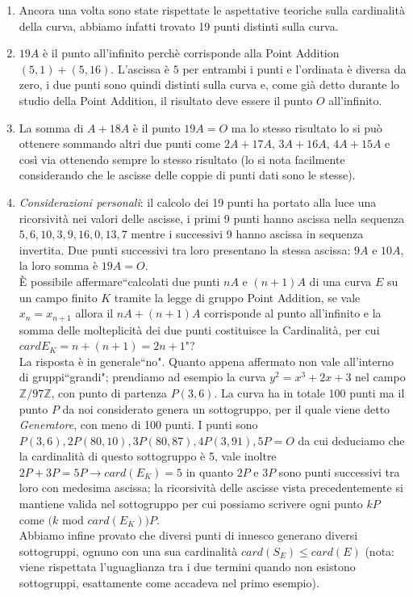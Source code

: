 \documentclass[a4paper,12pt]{tesiinfo}
\begin{document}
\begin{enumerate}
  
  \item Ancora una volta sono state rispettate le aspettative teoriche sulla cardinalit\`a della curva, abbiamo infatti trovato 19 punti distinti sulla curva.
  
  \item $19A$ \`e il punto all'infinito perch\`e corrisponde alla Point Addition $(5, 1) + (5, 16)$. L'ascissa \`e $5$ per entrambi i punti e l'ordinata \`e diversa da zero, i due punti sono quindi distinti sulla curva e, come gi\`a detto durante lo studio della Point Addition, il risultato deve essere il punto $O$ all'infinito.
  
  \item La somma di $A + 18A$ \`e il punto $19A = O$ ma lo stesso risultato lo si pu\`o ottenere sommando altri due punti come $2A + 17A$, $3A + 16A$, $4A + 15A$ e cos\`i via ottenendo sempre lo stesso risultato (lo si nota facilmente considerando che le ascisse delle coppie di punti dati sono le stesse).
  
  \item \textit{Considerazioni personali}: il calcolo dei 19 punti ha portato alla luce una ricorsivit\`a nei valori delle ascisse, i primi 9 punti hanno ascissa nella sequenza $5, 6, 10, 3, 9, 16, 0, 13, 7$ mentre i successivi 9 hanno ascissa in sequenza invertita. Due punti successivi tra loro presentano la stessa ascissa: $9A$ e $10A$, la loro somma \`e $19A = O$. 
  \\
  \`E possibile affermare``calcolati due punti $nA$ e $(n+1)A$ di una curva $E$ su un campo finito $K$ tramite la legge di gruppo Point Addition, se vale $x_n = x_{n+1}$ allora il $nA + (n+1)A$ corrisponde al punto all'infinito e la somma delle molteplicit\`a dei due punti costituisce la Cardinalit\`a, per cui $cardE_K = n+(n+1) = 2n+1$"?
  \\
  La risposta \`e in generale``no". Quanto appena affermato non vale all'interno di gruppi``grandi"; prendiamo ad esempio la curva $y^2 = x^3 + 2x+3$ nel campo $\mathbb{Z}/97\mathbb{Z}$, con punto di partenza $P(3, 6)$. La curva ha in totale 100 punti ma il punto $P$ da noi considerato genera un sottogruppo, per il quale viene detto \textit{Generatore}, con meno di 100 punti. I punti sono $P(3, 6), 2P(80, 10), 3P(80, 87), 4P(3, 91), 5P = O$ da cui deduciamo che la cardinalit\`a di questo sottogruppo \`e 5, vale inoltre $2P+3P = 5P \to card(E_K) = 5$ in quanto $2P$ e $3P$ sono punti successivi tra loro con medesima ascissa; la ricorsivit\`a delle ascisse vista precedentemente si mantiene valida nel sottogruppo per cui possiamo scrivere ogni punto $kP$ come $(k$ mod $card(E_K))P$.\\
  Abbiamo infine provato che diversi punti di innesco generano diversi sottogruppi, ognuno con una sua cardinalit\`a $card(S_E) \le card(E)$ (nota: viene rispettata l'uguaglianza tra i due termini quando non esistono sottogruppi, esattamente come accadeva nel primo esempio). 
  
\end{enumerate}
\end{document}
